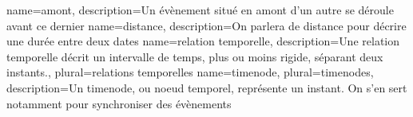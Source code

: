 {
    name=amont,
    description={Un évènement situé en amont d'un autre se déroule avant ce dernier}
}
{
    name=distance,
    description={On parlera de distance pour décrire une durée entre deux dates}
}
{
  name={relation temporelle},
  description={Une relation temporelle décrit un intervalle de temps, plus ou moins rigide, séparant deux instants.},
  plural={relations temporelles}
}
{
  name={timenode},
  plural={timenodes},
  description={Un timenode, ou noeud temporel, représente un instant. On s'en sert notamment pour synchroniser des évènements}
}

